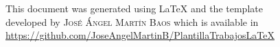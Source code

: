 \documentclass[11pt]{article}
\newif\ifspanish %
\begin{document}
\null\vfill
\begin{center}
\ifspanish
	Este documento ha sido generado con \LaTeX{} utilizando la plantilla\\
	desarrollada por \textsc{José Ángel Martín Baos} y disponible en\\
	\url{https://github.com/JoseAngelMartinB/PlantillaTrabajosLaTeX}
\else
	This document was generated using \LaTeX{} and the template\\
	developed by \textsc{José Ángel Martín Baos} which is available in\\
	\url{https://github.com/JoseAngelMartinB/PlantillaTrabajosLaTeX}
\fi
\end{center}
\end{document}
